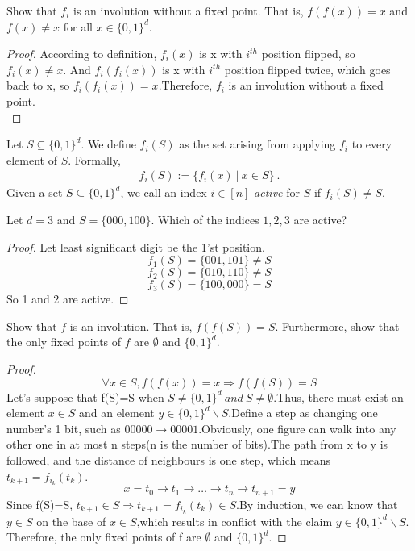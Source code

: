 \begin{exercise}
 Show that $f_i$ is an involution without a fixed point.
 That is, $f(f(x)) = x$ and $f(x) \ne x$ for all $x \in \{0,1\}^d$.
\end{exercise}

\begin{proof}
According to definition, $f_i(x)$ is x with $i^{th}$ position flipped, so $f_i(x) \neq x$. And $f_i(f_i(x))$ is x with $i^{th}$
position flipped twice, which goes back to x, so $f_i(f_i(x)) = x$.Therefore, $f_i$ is an involution without a fixed point.\\
\end{proof}

Let $S \subseteq \{0,1\}^d$. We define  $f_i(S)$ as the set arising from applying
$f_i$ to every element of $S$. Formally,
\begin{align*}
f_i(S) := \{ f_i(x) \ | \ x \in S \} \ .
\end{align*}
Given a set $S \subseteq \{0,1\}^d$, we call an index $i \in [n]$ {\em active} for $S$
if $f_i(S) \ne S$. 
\begin{exercise}
Let $d=3$ and $S = \{000, 100\}$. Which of the indices $1,2,3$ are active?
\end{exercise}

\begin{proof}
Let least significant digit be the 1'st position.\\
\[f_1(S) = \{001,101\} \neq S\]
\[f_2(S) = \{010,110\} \neq S\]
\[f_3(S) = \{100,000\} = S\]
So 1 and 2 are active.
\end{proof}

\begin{exercise}
 Show that $f$ is an involution. That is, $f(f(S)) = S$. Furthermore, show that
 the only fixed points of $f$ are $\emptyset$ and $\{0,1\}^d$.
\end{exercise} 

\begin{proof}
\[\forall x \in S, f(f(x)) = x \Rightarrow f(f(S))=S\]
Let's suppose that f(S)=S when $S \neq \{0,1\}^d\:and\: S \neq \emptyset$.Thus, there must exist an element $x\in S$ and an element $y\in \{0,1\}^d\backslash S$.Define a step as changing one number's 1 bit, such as $00000 \rightarrow 00001$.Obviously, one figure can walk into any other one in at most n steps(n is the number of bits).The path from x to y is followed, and the distance of neighbours is one step, which means $t_{k+1}=f_{i_k}(t_k)$.
\[x=t_0 \rightarrow t_1 \rightarrow\ldots\rightarrow t_n \rightarrow t_{n+1}=y\]
Since f(S)=S, $t_{k+1}\in S \Rightarrow t_{k+1}=f_{i_k}(t_k)\in S$.By induction, we can know that $y\in S$ on the base of $x\in S$,which results in conflict with the claim $y\in \{0,1\}^d\backslash S$. Therefore, the only fixed points of f are $\emptyset$ and $\{0,1\}^d$.
\end{proof}


